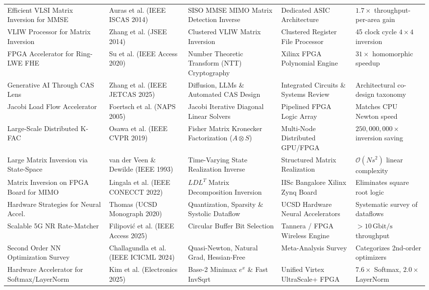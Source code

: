 \begin{table}[htbp]
{\begin{tabular}{p{4.5cm} p{3.5cm} p{4.5cm} p{4.0cm} p{3.5cm}}
Efficient VLSI Matrix Inversion for MMSE~\cite{auras2014efficient} & Auras et al. (IEEE ISCAS 2014) & SISO MMSE MIMO Matrix Detection Inverse & Dedicated ASIC Architecture & $1.7\times$ throughput-per-area gain \\
VLIW Processor for Matrix Inversion~\cite{zhang2014efficient} & Zhang et al. (JSEE 2014) & Clustered VLIW Matrix Inversion & Clustered Register File Processor & 45 clock cycle $4\times 4$ inversion \\
FPGA Accelerator for Ring-LWE FHE~\cite{su2020fpga} & Su et al. (IEEE Access 2020) & Number Theoretic Transform (NTT) Cryptography & Xilinx FPGA Polynomial Engine & $31\times$ homomorphic speedup \\
Generative AI Through CAS Lens~\cite{zhang2025generative} & Zhang et al. (IEEE JETCAS 2025) & Diffusion, LLMs \& Automated CAS Design & Integrated Circuits \& Systems Review & Architectural co-design taxonomy \\
Jacobi Load Flow Accelerator~\cite{foertsch2005jacobi} & Foertsch et al. (NAPS 2005) & Jacobi Iterative Diagonal Linear Solvers & Pipelined FPGA Logic Array & Matches CPU Newton speed \\
Large-Scale Distributed K-FAC~\cite{osawa2019large} & Osawa et al. (IEEE CVPR 2019) & Fisher Matrix Kronecker Factorization ($A \otimes S$) & Multi-Node Distributed GPU/FPGA & $250,000,000\times$ inversion saving \\
Large Matrix Inversion via State-Space~\cite{van1993large} & van der Veen \& Dewilde (IEEE 1993) & Time-Varying State Realization Inverse & Structured Matrix Realization & $\mathcal{O}(N s^2)$ linear complexity \\
Matrix Inversion on FPGA Board for MIMO~\cite{lingala2022matrix} & Lingala et al. (IEEE CONECCT 2022) & $L D L^T$ Matrix Decomposition Inversion & IISc Bangalore Xilinx Zynq Board & Eliminates square root logic \\
Hardware Strategies for Neural Accel.~\cite{thomas2020hardware} & Thomas (UCSD Monograph 2020) & Quantization, Sparsity \& Systolic Dataflow & UCSD Hardware Neural Accelerators & Systematic survey of dataflows \\
Scalable 5G NR Rate-Matcher~\cite{filipovic2025scalable} & Filipović et al. (IEEE Access 2025) & Circular Buffer Bit Selection & Tannera / FPGA Wireless Engine & $>10\,\text{Gbit/s}$ throughput \\
Second Order NN Optimization Survey~\cite{challagundla2024second} & Challagundla et al. (IEEE ICICML 2024)& Quasi-Newton, Natural Grad, Hessian-Free & Meta-Analysis Survey & Categorizes 2nd-order optimizers \\
Hardware Accelerator for Softmax/LayerNorm~\cite{kim2025hardware} & Kim et al. (Electronics 2025) & Base-2 Minimax $e^x$ \& Fast InvSqrt & Unified Virtex UltraScale+ FPGA & $7.6\times$ Softmax, $2.0\times$ LayerNorm \\
\bottomrule
\end{tabular}%
}
\end{table}

